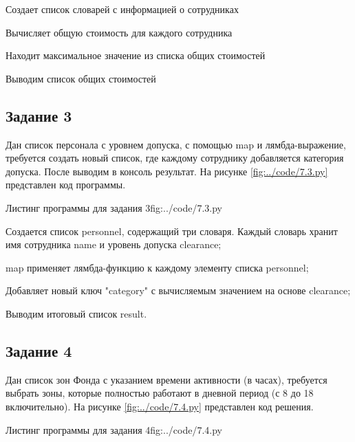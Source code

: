 \documentclass{vvsu}
\begin{document}
\begin{vvsu_list}
  \item Создает список словарей с информацией о сотрудниках
  \item Вычисляет общую стоимость для каждого сотрудника
  \item Находит максимальное значение из списка общих стоимостей
\end{vvsu_list} 
  Выводим список общих стоимостей

\subsection{Задание 3}
  Дан список персонала с уровнем допуска, с помощью map и лямбда-выражение, требуется создать новый список, где каждому сотруднику добавляется категория допуска. После выводим в консоль результат.
На рисунке \ref{fig:../code/7.3.py} представлен код программы.

\begin{vvsu_figure}{Листинг программы для задания 3}{fig:../code/7.3.py}
  \begin{minipage}{.75\textwidth}
    
  \end{minipage}
\end{vvsu_figure}

\begin{vvsu_list}
  \item Создается список personnel, содержащий три словаря. Каждый словарь хранит имя сотрудника name и уровень допуска clearance;
  \item map применяет лямбда-функцию к каждому элементу списка personnel;
  \item Добавляет новый ключ "category" с вычисляемым значением на основе clearance;
\end{vvsu_list}
  Выводим итоговый список result.

\subsection{Задание 4}
  Дан список зон Фонда с указанием времени активности (в часах), требуется выбрать зоны, которые полностью работают в дневной период (с 8 до 18 включительно).
На рисунке \ref{fig:../code/7.4.py} представлен код решения.

\begin{vvsu_figure}{Листинг программы для задания 4}{fig:../code/7.4.py}
  \begin{minipage}{.75\textwidth}
    
  \end{minipage}
\end{vvsu_figure}
\end{document}
